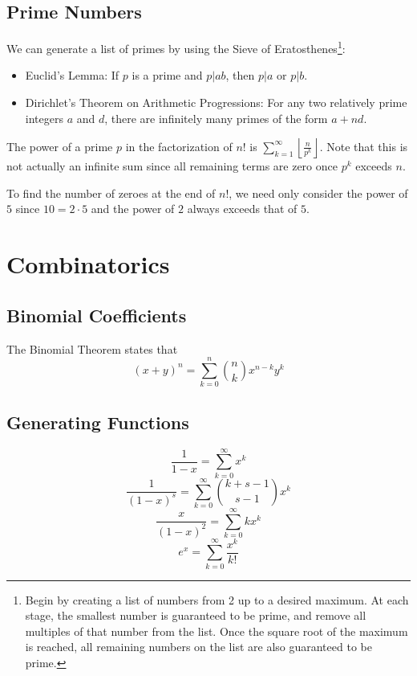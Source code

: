 \documentclass{article}
\begin{document}
\subsection{Prime Numbers}
We can generate a list of primes by using the Sieve of Eratosthenes\footnote{Begin by creating a list of numbers from 2 up to a desired maximum. At each stage, the smallest number is guaranteed to be prime, and remove all multiples of that number from the list. Once the square root of the maximum is reached, all remaining numbers on the list are also guaranteed to be prime.}:

\begin{itemize}
	\item Euclid's Lemma: If $p$ is a prime and $p | ab$, then $p | a$ or $p | b$.
	\item Dirichlet's Theorem on Arithmetic Progressions: For any two relatively prime integers $a$ and $d$, there are infinitely many primes of the form $a + nd$.
\end{itemize}
The power of a prime $p$ in the factorization of $n!$ is $\sum_{k = 1}^\infty \left \lfloor \frac{n}{p^k} \right \rfloor$. Note that this is not actually an infinite sum since all remaining terms are zero once $p^k$ exceeds $n$.

To find the number of zeroes at the end of $n!$, we need only consider the power of $5$ since $10 = 2 \cdot 5$ and the power of $2$ always exceeds that of $5$.

\section{Combinatorics}
\subsection{Binomial Coefficients}

The Binomial Theorem states that
\[ (x + y)^n = \sum_{k = 0}^n \binom{n}{k} x^{n - k}y^k \]

\subsection{Generating Functions}
\nopagebreak
\begin{multicols}{2}
	\[ \frac{1}{1 - x} = \sum_{k = 0}^\infty x^k \]
	\[ \frac{1}{(1 - x)^s} = \sum_{k = 0}^\infty \binom{k + s - 1}{s - 1}x^k  \]
	\[ \frac{x}{(1 - x)^2} = \sum_{k = 0}^\infty k x^k \]
	\[ e^x = \sum_{k = 0}^\infty \frac{x^k}{k!} \]
\end{multicols}
\end{document}
